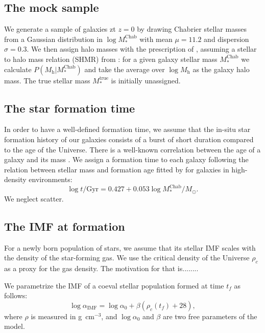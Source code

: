 \documentclass{emulateapj}
\def\mhalo{M_{\mathrm{h}}}
\def\mtrue{M_*^{\mathrm{true}}}
\def\mchab{M_*^{\mathrm{Chab}}}
\def\rhoc{\rho_c}
\def\aimf{\alpha_{\mathrm{IMF}}}
\def\loga0{\log{\alpha_0}}
\begin{document}
\subsection{The mock sample}

We generate a sample of galaxies zt $z=0$ by drawing Chabrier stellar masses from a Gaussian distribution in $\log{\mchab}$ with mean $\mu=11.2$ and dispersion $\sigma=0.3$.
We then assign halo masses with the prescription of \citet{Nip++12}, assuming a stellar to halo mass relation (SHMR) from \citet{Lea++12}: for a given galaxy stellar mass $\mchab$ we calculate $P(\mhalo|\mchab)$ and take the average over $\log{\mhalo}$ as the galaxy halo mass.
The true stellar mass $\mtrue$ is initially unassigned.


\subsection{The star formation time}

In order to have a well-defined formation time, we assume that the in-situ star formation history of our galaxies consists of a burst of short duration compared to the age of the Universe.
There is a well-known correlation between the age of a galaxy and its mass \citep[e.g.]{Tho++05}.
We assign a formation time to each galaxy following the relation between stellar mass and formation age fitted by \citet{Tho++05} for galaxies in high-density environments:
\begin{equation}\label{eq:tform}
\log{t/\mathrm{Gyr}} = 0.427 + 0.053\log{\mchab/M_\odot}.
\end{equation}
We neglect scatter.



\subsection{The IMF at formation}
\label{ssect:imfform}

For a newly born population of stars, we assume that its stellar IMF scales with the density of the star-forming gas.
We use the critical density of the Universe $\rhoc$ as a proxy for the gas density.
The motivation for that is........

We parametrize the IMF of a coeval stellar population formed at time $t_f$ as follows:
\begin{equation}\label{eq:aimf_form}
\log{\aimf} = \loga0 + \beta(\rhoc(t_f) + 28),
\end{equation}
where $\rho$ is measured in g~cm$^{-3}$, and $\loga0$ and $\beta$ are two free parameters of the model.
\end{document}
